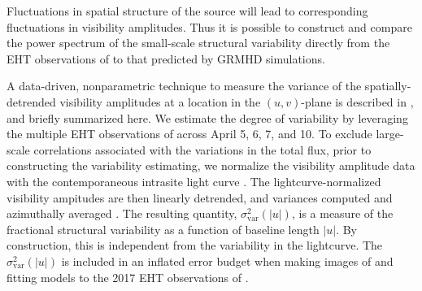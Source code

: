 


Fluctuations in spatial structure of the source will lead to corresponding fluctuations in visibility amplitudes. Thus it is possible to construct and compare the power spectrum of the small-scale structural variability directly from the EHT observations of \sgra to that predicted by GRMHD simulations.

A data-driven, nonparametric technique to measure the variance of the spatially-detrended visibility amplitudes at a location in the $(u,v)$-plane is described in \citet{NoiseModeling}, and briefly summarized here.  We estimate the degree of variability by leveraging the multiple EHT observations of \sgra across April 5, 6, 7, and 10.  To exclude large-scale correlations associated with the variations in the total flux, prior to constructing the variability estimating, we normalize the visibility amplitude data with the contemporaneous intrasite light curve \citep{Georgiev_2022}.  The lightcurve-normalized visibility ampitudes are then linearly detrended, and variances computed and azimuthally averaged \citep{NoiseModeling}.  The resulting quantity, $\sigma_\text{var}^2 (|u|)$, is a measure of the fractional structural variability as a function of baseline length $|u|$.  By construction, this is independent from the variability in the lightcurve.  The $\sigma_\text{var}^2 (|u|)$ is included in an inflated error budget when making images of and fitting models to the 2017 EHT observations of \sgra {}.

